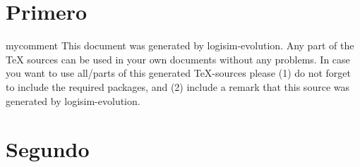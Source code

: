 \documentclass [15pt,a4paper,twoside]{book}
\begin{document}
\chapter{Primero}
\begin{taggedblock}{mycomment}
This document was generated by logisim-evolution. Any part of the TeX sources can be used in your own documents without any problems. In case you want to use all/parts of this generated TeX-sources please (1) do not forget to include the required packages, and (2) include a remark that this source was generated by logisim-evolution.
\chapter{Segundo}
\end{taggedblock}
\end{document}
